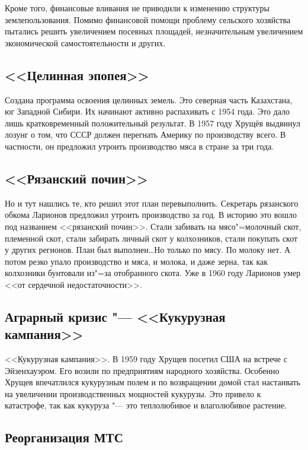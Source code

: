 Кроме того, финансовые вливания не приводили к изменению структуры землепользования. Помимо финансовой помощи проблему сельского хозяйства пытались решить увеличением посевных площадей, незначительным увеличением экономической самостоятельности и других. 

\subsection{<<Целинная эпопея>>}

Создана программа освоения целинных земель. Это северная часть Казахстана, юг Западной Сибири. Их начинают активно распахивать с 1954 года. Это дало лишь кратковременный положительный результат. В 1957 году Хрущёв выдвинул лозунг о том, что СССР должен перегнать Америку по производству всего. В частности, он предложил утроить производство мяса в стране за три года. 

\subsection{<<Рязанский почин>>}

Но и тут нашлись те, кто решил этот план перевыполнить. Секретарь рязанского обкома Ларионов предложил утроить производство за год. В историю это вошло под названием <<рязанский почин>>. Стали забивать на мясо"=молочный скот, племенной скот, стали забирать личный скот у колхозников, стали покупать скот у других регионов. План был выполнен\dots Но только по мясу. По молоку нет. А потом резко упало производство и мяса, и молока, и даже зерна, так как колхозники бунтовали из"=за отобранного скота. Уже в 1960 году Ларионов умер <<от сердечной недостаточности>>.

\subsection{Аграрный кризис "--- <<Кукурузная кампания>>}

<<Кукурузная кампания>>. В 1959 году Хрущев посетил США на встрече с Эйзенхауэром. Его возили по предприятиям народного хозяйства. Особенно Хрущев впечатлился кукурузным полем и по возвращении домой стал настаивать на увеличении производственных мощностей кукурузы. Это привело к катастрофе, так как кукуруза "--- это теплолюбивое и влаголюбивое растение.

\subsection{Реорганизация МТС}

